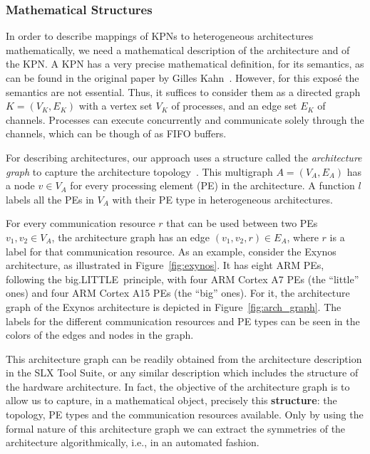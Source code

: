 \documentclass[sigplan,10pt]{acmart}
\begin{document}
\subsubsection{Mathematical Structures}

In order to describe mappings of KPNs to heterogeneous architectures mathematically, we need a mathematical description of the architecture and of the KPN. 
A KPN has a very precise mathematical definition, for its semantics, as can be found in the original paper by Gilles Kahn~\cite{kahn74}. However, for this exposé the semantics are not essential. Thus, it suffices to consider them as a directed
graph $K = (V_K,E_K)$ with a vertex set $V_K$ of processes, and an edge set $E_K$ of channels. Processes can execute concurrently and communicate solely through the channels, which can be though of as FIFO buffers.

For describing architectures, our approach uses a structure called the \emph{architecture graph} to capture the architecture topology~\cite{castrillon2012}. This multigraph $A = (V_A, E_A)$ has a node $v \in V_A$ for every processing element (PE) in the architecture.
A function $l$ labels all the PEs in $V_A$ with their PE type in heterogeneous architectures.

For every communication resource $r$ that can be used between two PEs $v_1, v_2 \in V_A$, the architecture graph has an edge $(v_1,v_2,r) \in E_A$, where $r$ is a label for that communication resource.
As an example, consider the Exynos architecture, as illustrated in Figure~\ref{fig:exynos}.
It has eight ARM PEs, following the big.LITTLE\texttrademark~principle, with four ARM Cortex A7 PEs (the ``little'' ones) and four ARM Cortex A15 PEs (the ``big'' ones). 
For it, the architecture graph of the Exynos architecture is depicted in Figure~\ref{fig:arch_graph}. The labels for the different communication resources and PE types can be seen in the colors of the edges and nodes in the graph.

This architecture graph can be readily obtained from the architecture description in the SLX Tool Suite, or any similar description which includes the structure of the hardware architecture. 
In fact, the objective of the architecture graph is to allow us to capture, in a mathematical object, precisely this \textbf{structure}: the topology, PE types and the communication resources available.
Only by using the formal nature of this architecture graph we can extract the symmetries of the architecture algorithmically, i.e., in an automated fashion.
\end{document}
